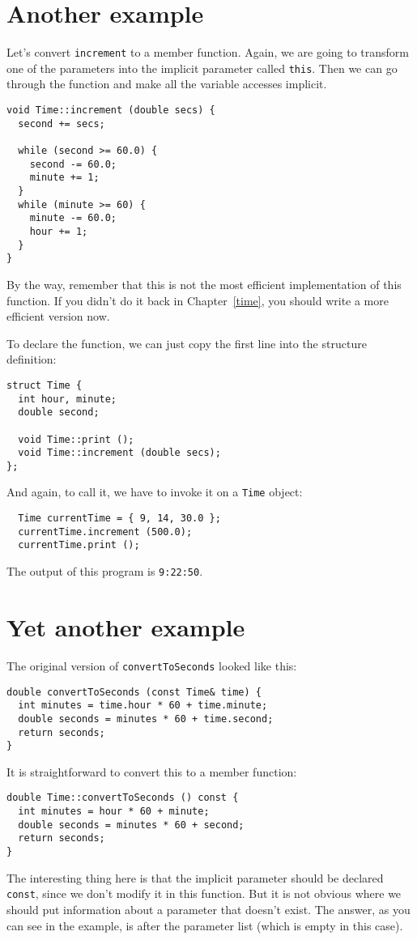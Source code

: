 \section {Another example}

Let's convert {\tt increment} to a member function.  Again, we
are going to transform one of the parameters into the implicit
parameter called {\tt this}.  Then we can go through the function
and make all the variable accesses implicit.

\begin{verbatim}
void Time::increment (double secs) {
  second += secs;

  while (second >= 60.0) {
    second -= 60.0;
    minute += 1;
  }
  while (minute >= 60) {
    minute -= 60.0;
    hour += 1;
  }
}
\end{verbatim}
%
By the way, remember that this is not the most efficient implementation
of this function.  If you didn't do it back in Chapter~\ref{time}, you
should write a more efficient version now.

To declare the function, we can just copy the first line into the
structure definition:

\begin{verbatim}
struct Time {
  int hour, minute;
  double second;

  void Time::print ();
  void Time::increment (double secs);
};
\end{verbatim}
%
And again, to call it, we have to invoke it on a {\tt Time}
object:

\begin{verbatim}
  Time currentTime = { 9, 14, 30.0 };
  currentTime.increment (500.0);
  currentTime.print ();
\end{verbatim}
%
The output of this program is {\tt 9:22:50}.

\section{Yet another example}

The original version of {\tt convertToSeconds} looked like this:

\begin{verbatim}
double convertToSeconds (const Time& time) {
  int minutes = time.hour * 60 + time.minute;
  double seconds = minutes * 60 + time.second;
  return seconds;
}
\end{verbatim}
%
It is straightforward to convert this to a member function:

\begin{verbatim}
double Time::convertToSeconds () const {
  int minutes = hour * 60 + minute;
  double seconds = minutes * 60 + second;
  return seconds;
}
\end{verbatim}
%
The interesting thing here is that the implicit parameter should
be declared {\tt const}, since we don't modify it in this function.
But it is not obvious where we should put information about a
parameter that doesn't exist.  The answer, as you can see in the
example, is after the parameter list (which is empty in this case).

